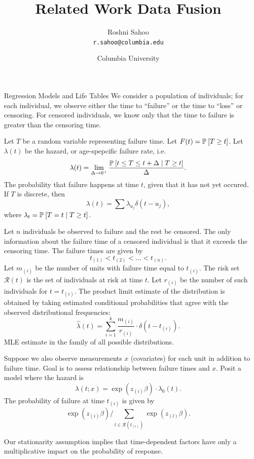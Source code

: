 \documentclass{article}
\author{Roshni Sahoo\\
  \texttt{r.sahoo@columbia.edu}}
\title{Related Work Data Fusion}
\date{Columbia University}
\theoremstyle{definition}
\theoremstyle{plain}
\theoremstyle{remark}
\begin{document}
\maketitle

\begin{section}{Regression Models and Life Tables}
We consider a population of individuals; for each individual, we observe either the time to ``failure'' or the time to ``loss'' or censoring. For censored individuals, we know only that the time to failure is greater than the censoring time.

Let $T$ be a random variable representing failure time. Let $F(t) = \PP[]{T \geq t}$. Let $\lambda(t)$ be the hazard, or age-spepcific failure rate, i.e. 
\[\lambda(t) = \lim_{\Delta \rightarrow 0^{+}} \frac{\PP[]{t \leq T \leq t + \Delta \mid T \geq t}}{\Delta}.\]
The probability that failure happens at time $t$, given that it has not yet occured. If $T$ is discrete, then 
\[ \lambda(t) = \sum \lambda_{u_{j}} \delta(t - u_{j}),\]
where $\lambda_{t} = \PP[]{T=t \mid T \geq t}$.

Let $n$ individuals be observed to failure and the rest be censored. The only information about the failure time of a censored individual is that it exceeds the censoring time. The failure times are given by 
\[ t_{(1)} < t_{(2)} < \dots < t_{(n)}.\]
Let $m_{(i)}$ be the number of units with failure time equal to $t_{(i)}$. The risk set $\mathcal{R}(t)$ is the set of individuals at risk at time $t$. Let $r_{(i)}$ be the number of such individuals for $t=t_{(i)}$. The product limit estimate of the distribution is obtained by taking estimated conditional probabilities that agree with the observed distributional frequencies:
\[ \hat{\lambda}(t) = \sum_{i=1}^{k} \frac{m_{(i)}}{r_{(i)}} \cdot \delta(t - t_{(i)}).\]
MLE estimate in the family of all possible distributions.

Suppose we also observe measurements $x$ (covariates) for each unit in addition to failure time. Goal is to assess relationship between failure times and $x$. Posit a model where the hazard is 
\[ \lambda(t; x) = \exp(z_{(i)} \beta) \cdot \lambda_{0}(t).\]
The probability of failure at time $t_{(i)}$ is given by
\[ \exp(z_{(i)} \beta) \Big/ \sum_{l \in \mathcal{R}(t_{(i)})} \exp(z_{(l)} \beta).\]


Our stationarity assumption implies that time-dependent factors have only a multiplicative impact on the probability of response.

\end{section}
\end{document}
